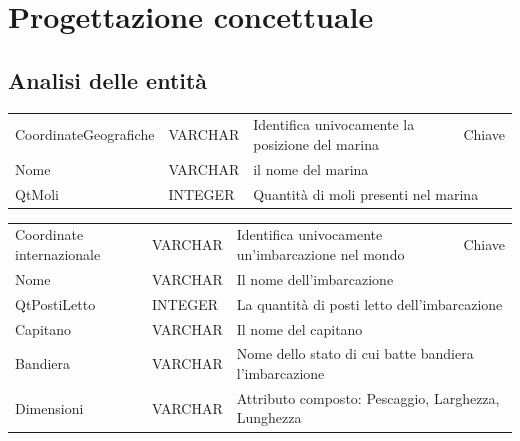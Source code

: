 \section{Progettazione concettuale}

\subsection{Analisi delle entità}

\begin{center}
    \begin{tabularx}{\textwidth}{|l|l|l|X|}
        \hline
        \rowcolor{gray!30}
        \multicolumn{4}{|c|}{\textbf{Marina}}\\
        \hline
        CoordinateGeografiche & VARCHAR & Identifica univocamente la posizione del marina & Chiave \\
        \hline
        Nome & VARCHAR & \multicolumn{2}{l|}{il nome del marina} \\
        \hline
        QtMoli & INTEGER & \multicolumn{2}{l|}{Quantità di moli presenti nel marina} \\
        \hline
    \end{tabularx}
\end{center}

\begin{center}
    \begin{tabularx}{\textwidth}{|l|l|l|X|}
        \hline
        \rowcolor{gray!30}
        \multicolumn{4}{|c|}{\textbf{Imbarcazione}}\\
        \hline
        Coordinate internazionale & VARCHAR & Identifica univocamente un'imbarcazione nel mondo & Chiave \\
        \hline
        Nome & VARCHAR & \multicolumn{2}{l|}{Il nome dell'imbarcazione} \\
        \hline
        QtPostiLetto & INTEGER & \multicolumn{2}{l|}{La quantità di posti letto dell'imbarcazione} \\
        \hline
        Capitano & VARCHAR & \multicolumn{2}{l|}{Il nome del capitano} \\
        \hline
        Bandiera & VARCHAR & \multicolumn{2}{l|}{Nome dello stato di cui batte bandiera l'imbarcazione} \\
        \hline
        Dimensioni & VARCHAR & \multicolumn{2}{l|}{Attributo composto: Pescaggio, Larghezza, Lunghezza} \\
        \hline
    \end{tabularx}
\end{center}


